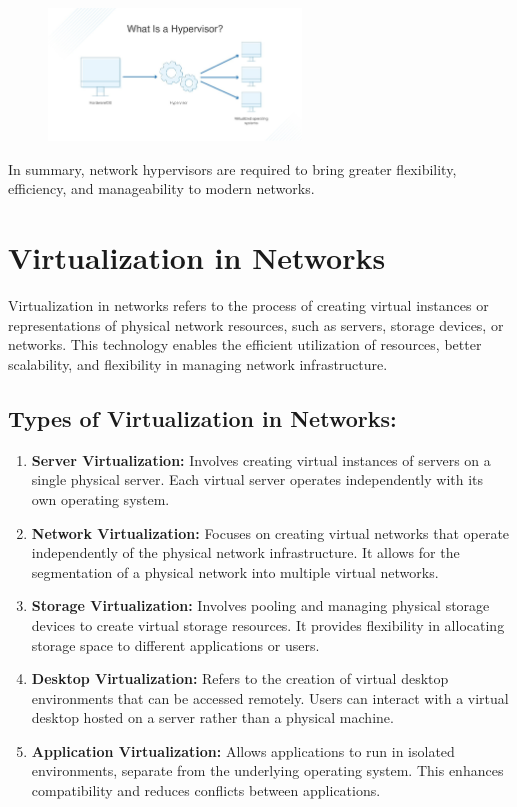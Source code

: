 \documentclass{report}
\begin{document}
\begin{figure}[h] 
    \centering 
    \includegraphics[width=0.6\textwidth]{1.jpg}
\end{figure} 

In summary, network hypervisors are required to bring greater flexibility, efficiency, and manageability to modern networks. 


\section*{Virtualization in Networks\cite{4}}

Virtualization in networks refers to the process of creating virtual instances or representations of physical network resources, such as servers, storage devices, or networks.
 This technology enables the efficient utilization of resources, better scalability, and flexibility in managing network infrastructure.

\subsection*{Types of Virtualization in Networks:}

\begin{enumerate}
  \item \textbf{Server Virtualization:}
    Involves creating virtual instances of servers on a single physical server. Each virtual server operates independently with its own operating system.

  \item \textbf{Network Virtualization:}
    Focuses on creating virtual networks that operate independently of the physical network infrastructure. It allows for the segmentation of a physical network into multiple virtual networks.

  \item \textbf{Storage Virtualization:}
    Involves pooling and managing physical storage devices to create virtual storage resources. It provides flexibility in allocating storage space to different applications or users.

  \item \textbf{Desktop Virtualization:}
    Refers to the creation of virtual desktop environments that can be accessed remotely. Users can interact with a virtual desktop hosted on a server rather than a physical machine.

  \item \textbf{Application Virtualization:}
    Allows applications to run in isolated environments, separate from the underlying operating system. This enhances compatibility and reduces conflicts between applications.
\end{enumerate}
\end{document}

